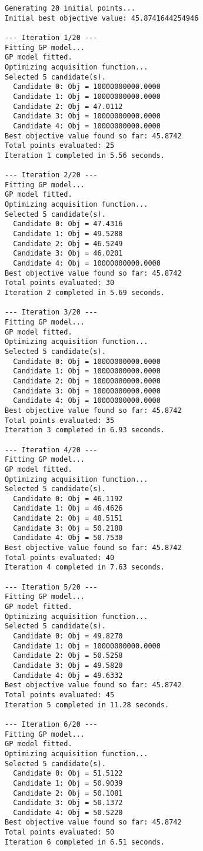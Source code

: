 \documentclass[
  letterpaper,
  DIV=11,
  numbers=noendperiod]{scrartcl}
\begin{document}
\begin{verbatim}
Generating 20 initial points...
Initial best objective value: 45.8741644254946

--- Iteration 1/20 ---
Fitting GP model...
GP model fitted.
Optimizing acquisition function...
Selected 5 candidate(s).
  Candidate 0: Obj = 10000000000.0000
  Candidate 1: Obj = 10000000000.0000
  Candidate 2: Obj = 47.0112
  Candidate 3: Obj = 10000000000.0000
  Candidate 4: Obj = 10000000000.0000
Best objective value found so far: 45.8742
Total points evaluated: 25
Iteration 1 completed in 5.56 seconds.

--- Iteration 2/20 ---
Fitting GP model...
GP model fitted.
Optimizing acquisition function...
Selected 5 candidate(s).
  Candidate 0: Obj = 47.4316
  Candidate 1: Obj = 49.5288
  Candidate 2: Obj = 46.5249
  Candidate 3: Obj = 46.0201
  Candidate 4: Obj = 10000000000.0000
Best objective value found so far: 45.8742
Total points evaluated: 30
Iteration 2 completed in 5.69 seconds.

--- Iteration 3/20 ---
Fitting GP model...
GP model fitted.
Optimizing acquisition function...
Selected 5 candidate(s).
  Candidate 0: Obj = 10000000000.0000
  Candidate 1: Obj = 10000000000.0000
  Candidate 2: Obj = 10000000000.0000
  Candidate 3: Obj = 10000000000.0000
  Candidate 4: Obj = 10000000000.0000
Best objective value found so far: 45.8742
Total points evaluated: 35
Iteration 3 completed in 6.93 seconds.

--- Iteration 4/20 ---
Fitting GP model...
GP model fitted.
Optimizing acquisition function...
Selected 5 candidate(s).
  Candidate 0: Obj = 46.1192
  Candidate 1: Obj = 46.4626
  Candidate 2: Obj = 48.5151
  Candidate 3: Obj = 50.2188
  Candidate 4: Obj = 50.7530
Best objective value found so far: 45.8742
Total points evaluated: 40
Iteration 4 completed in 7.63 seconds.

--- Iteration 5/20 ---
Fitting GP model...
GP model fitted.
Optimizing acquisition function...
Selected 5 candidate(s).
  Candidate 0: Obj = 49.8270
  Candidate 1: Obj = 10000000000.0000
  Candidate 2: Obj = 50.5258
  Candidate 3: Obj = 49.5820
  Candidate 4: Obj = 49.6332
Best objective value found so far: 45.8742
Total points evaluated: 45
Iteration 5 completed in 11.28 seconds.

--- Iteration 6/20 ---
Fitting GP model...
GP model fitted.
Optimizing acquisition function...
Selected 5 candidate(s).
  Candidate 0: Obj = 51.5122
  Candidate 1: Obj = 50.9039
  Candidate 2: Obj = 50.1081
  Candidate 3: Obj = 50.1372
  Candidate 4: Obj = 50.5220
Best objective value found so far: 45.8742
Total points evaluated: 50
Iteration 6 completed in 6.51 seconds.


\end{verbatim}
\end{document}
